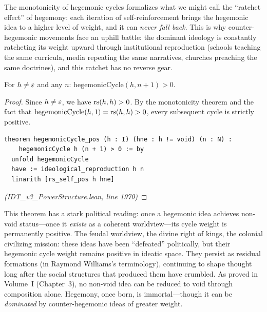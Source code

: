 \begin{remark}
The monotonicity of hegemonic cycles formalizes what we might call the
``ratchet effect'' of hegemony: each iteration of self-reinforcement brings the
hegemonic idea to a higher level of weight, and it can \emph{never fall back}.
This is why counter-hegemonic movements face an uphill battle: the dominant
ideology is constantly ratcheting its weight upward through institutional
reproduction (schools teaching the same curricula, media repeating the same
narratives, churches preaching the same doctrines), and this ratchet has no
reverse gear.
\end{remark}

\begin{theorem}
\label{thm:hegemonic-cycle-pos}
For $h \neq \varepsilon$ and any $n$:
$\mathrm{hegemonicCycle}(h, n+1) > 0$.
\end{theorem}

\begin{proof}
Since $h \neq \varepsilon$, we have $\mathrm{rs}(h,h) > 0$. By the monotonicity theorem
and the fact that $\mathrm{hegemonicCycle}(h, 1) = \mathrm{rs}(h,h) > 0$, every
subsequent cycle is strictly positive.
\begin{lstlisting}
theorem hegemonicCycle_pos (h : I) (hne : h != void) (n : N) :
    hegemonicCycle h (n + 1) > 0 := by
  unfold hegemonicCycle
  have := ideological_reproduction h n
  linarith [rs_self_pos h hne]
\end{lstlisting}
\textit{(IDT\_v3\_PowerStructure.lean, line 1970)}
\end{proof}

\begin{interpretation}
This theorem has a stark political reading: once a hegemonic idea achieves
non-void status---once it \emph{exists} as a coherent worldview---its cycle
weight is permanently positive. The feudal worldview, the divine right of kings,
the colonial civilizing mission: these ideas have been ``defeated'' politically,
but their hegemonic cycle weight remains positive in ideatic space. They persist
as residual formations (in Raymond Williams's terminology), continuing to shape
thought long after the social structures that produced them have crumbled. As
proved in Volume~I (Chapter~3), no non-void idea can be reduced to void through
composition alone. Hegemony, once born, is immortal---though it can be
\emph{dominated} by counter-hegemonic ideas of greater weight.
\end{interpretation}

